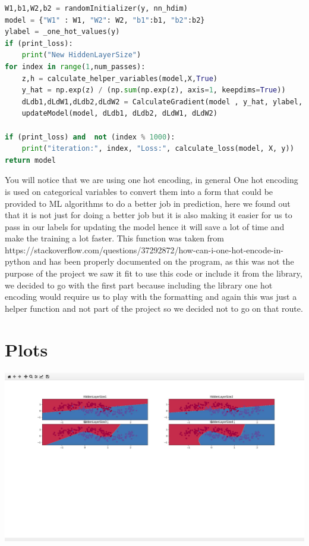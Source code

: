 \documentclass{article}
\begin{document}
\begin{lstlisting}[language=Python]
W1,b1,W2,b2 = randomInitializer(y, nn_hdim)
model = {"W1" : W1, "W2": W2, "b1":b1, "b2":b2}
ylabel = _one_hot_values(y)
if (print_loss):
	print("New HiddenLayerSize")
for index in range(1,num_passes):
	z,h = calculate_helper_variables(model,X,True)
	y_hat = np.exp(z) / (np.sum(np.exp(z), axis=1, keepdims=True))
	dLdb1,dLdW1,dLdb2,dLdW2 = CalculateGradient(model , y_hat, ylabel, h)
	updateModel(model, dLdb1, dLdb2, dLdW1, dLdW2)

if (print_loss) and  not (index % 1000):
	print("iteration:", index, "Loss:", calculate_loss(model, X, y))
return model
	\end{lstlisting}
You will notice that we are using one hot encoding, in general One hot encoding is used on categorical variables to convert them into a form that could be provided to ML algorithms to do a better job in prediction, here we found out that it is not just for doing a better job but it is also making it easier for us to pass in our labels for updating the model hence it will save a lot of time and make the training a lot faster. This function was taken from  https://stackoverflow.com/questions/37292872/how-can-i-one-hot-encode-in-python  and has been properly documented on the program, as this was not the purpose of the project we saw it fit to use this code or include it from the library, we decided to go with the first part because including the library one hot encoding would require us to play with the formatting and again this was just a helper function and not part of the project so we decided not to go on that route.

\section{Plots}
\includegraphics[scale=.25]{plot.jpg}
\end{document}
